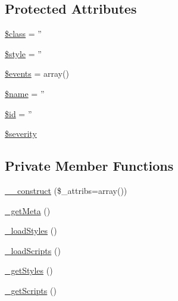 \subsection*{Protected Attributes}
\begin{DoxyCompactItemize}
\item 
\hyperlink{classBaseElement_a99976a8e967db92e7800309f359b0803}{\$class} = ''
\item 
\hyperlink{classBaseElement_a429a3d642dd95f30e1059ef29564b87d}{\$style} = ''
\item 
\hyperlink{classBaseElement_a02cebe45d277b4ff8f29db08bad371ba}{\$events} = array()
\item 
\hyperlink{classBaseElement_a30b8cff187a9de659a70daf287d66f45}{\$name} = ''
\item 
\hyperlink{classBaseElement_a11b6989c43b53869a09f5ce65aa55b45}{\$id} = ''
\item 
\hyperlink{class__OWL_ad26b40a9dbbacb33e299b17826f8327c}{\$severity}
\end{DoxyCompactItemize}
\subsection*{Private Member Functions}
\begin{DoxyCompactItemize}
\item 
\hyperlink{classDocument_a17714d96a9c52f6e1f33c7c735fc62a1}{\_\-\_\-construct} (\$\_\-attribs=array())
\item 
\hyperlink{classDocument_a53f0ed9a11539f3b05c58177a1fd17de}{\_\-getMeta} ()
\item 
\hyperlink{classDocument_a028acb7648c597466fe1d0759eaa2dc5}{\_\-loadStyles} ()
\item 
\hyperlink{classDocument_ad85ed59a203fdab7be3683e24e7e797f}{\_\-loadScripts} ()
\item 
\hyperlink{classDocument_af7c9033e29bbaf426a3be9ecb58357f5}{\_\-getStyles} ()
\item 
\hyperlink{classDocument_a1c4fc6edfec7cba79755ee26f9618cc5}{\_\-getScripts} ()
\end{DoxyCompactItemize}
